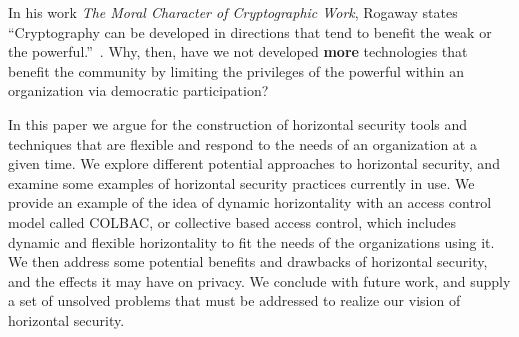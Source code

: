 In his work \textit{The Moral Character of
Cryptographic Work}, Rogaway states ``Cryptography can be developed in
directions that tend to benefit the weak or the
powerful.''~\cite{rogaway2015moral}. Why, then, have we not developed
\textbf{more} technologies that benefit the community by limiting the privileges
of the powerful within an organization via democratic participation?

In this paper we argue for the construction of horizontal security tools and
techniques that are flexible and respond to the needs of an organization at a
given time. We explore different potential approaches to horizontal security,
and examine some examples of horizontal security practices currently in use. We
provide an example of the idea of dynamic horizontality with an access control
model called COLBAC, or collective based access control, which includes dynamic
and flexible horizontality to fit the needs of the organizations using it. We 
then address some potential benefits and drawbacks of horizontal security, and
the effects it may have on privacy. We conclude with future work, and supply a
set of unsolved problems that must be addressed to realize our vision of
horizontal security.
